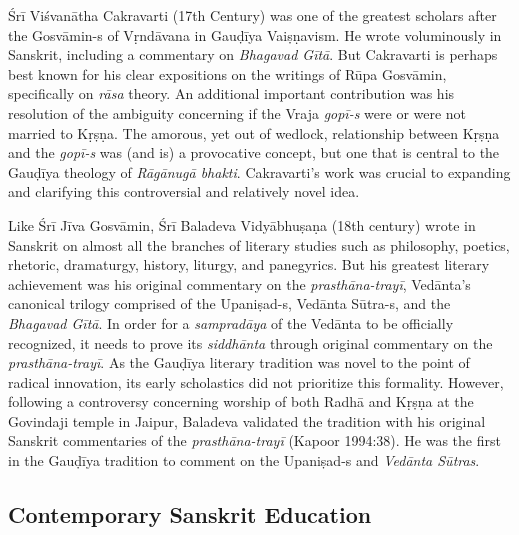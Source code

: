 Śrī Viśvanātha Cakravarti (17th Century) was one of the greatest scholars after the Gosvāmin-s of Vṛndāvana in Gauḍīya Vaiṣṇavism. He wrote voluminously in Sanskrit, including a commentary on {\sl Bhagavad Gītā}. But Cakravarti is perhaps best known for his clear expositions on the writings of Rūpa Gosvāmin, specifically on {\sl rāsa} theory. An additional important contribution was his resolution of the ambiguity concerning if the Vraja {\sl gopī-s} were or were not married to Kṛṣṇa. The amorous, yet out of wedlock, relationship between Kṛṣṇa and the {\sl gopī-s} was (and is) a provocative concept, but one that is central to the Gauḍīya theology of {\sl Rāgānugā bhakti}. Cakravarti’s work was crucial to expanding and clarifying this controversial and relatively novel idea. 

Like Śrī Jīva Gosvāmin, Śrī Baladeva Vidyābhuṣaṇa (18th century) wrote in Sanskrit on almost all the branches of literary studies such as philosophy, poetics, rhetoric, dramaturgy, history, liturgy, and panegyrics. But his greatest literary achievement was his original commentary on the {\sl prasthāna-trayī}, Vedānta’s canonical trilogy comprised of the Upaniṣad-s, Vedānta Sūtra-s, and the {\sl Bhagavad Gītā}. In order for a {\sl sampradāya} of the Vedānta to be officially recognized, it needs to prove its {\sl siddhānta} through original commentary on the {\sl prasthāna-trayī}. As the Gauḍīya literary tradition was novel to the point of radical innovation, its early scholastics did not prioritize this formality. However, following a controversy concerning worship of both Radhā and Kṛṣṇa at the Govindaji temple in Jaipur, Baladeva validated the tradition with his original Sanskrit commentaries of the {\sl prasthāna-trayī} (Kapoor 1994:38). He was the first in the Gauḍīya tradition to comment on the Upaniṣad-s and {\sl Vedānta Sūtras}. 
\vskip -100pt

\subsection*{Contemporary Sanskrit Education}
\vskip -5pt

